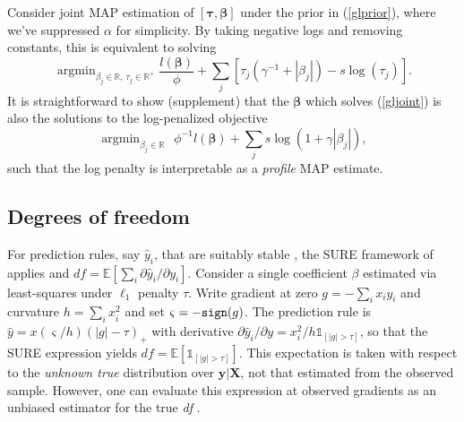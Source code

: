 \documentclass[12pt]{article}
\newcommand{\bs}[1]{\boldsymbol{#1}}
\newcommand{\bm}[1]{\mathbf{#1}}
\newcommand{\ds}[1]{\mathds{#1}}
\DeclareMathOperator*{\argmin}{argmin}
\begin{document}
Consider joint MAP estimation of $[\bs{\tau},\bs{\beta}]$ under the prior in
   (\ref{glprior}), where we've suppressed $\alpha$ for simplicity. By taking
   negative logs and removing constants, this is equivalent to solving
\begin{equation}\label{gljoint}
\argmin_{\beta_j\in\ds{R},~\tau_j \in \ds{R}^{+}}\!\!
\frac{l(\bs{\beta})}{\phi} + \sum_j \left[\tau_j(\gamma^{-1}+|\beta_j|) - s\log(\tau_j)\right].
\end{equation}
It is straightforward to show (supplement) that the $\bs{\beta}$ which solves (\ref{gljoint})  is also the solutions 
to the log-penalized objective 
\begin{equation}\label{logobj}
\argmin_{\beta_j\in\ds{R}}~~
\phi^{-1}l(\bs{\beta}) + \sum_j  s\log(1+\gamma|\beta_j|),
\end{equation}
such that the log penalty is interpretable as a {\it profile} MAP estimate.

\subsection{Degrees of freedom}


For prediction rules, say $\hat y_i$, that are suitably stable \citep[i.e.,
Lipschitz; see][]{zou_degrees_2007}, the SURE framework of
\cite{stein_estimation_1981} applies and  $df =
\ds{E}\left[\sum_i \partial \hat y_i/\partial y_i\right]$.
Consider  a single coefficient $\beta$ estimated via least-squares under $\ell_1$
penalty $\tau$.   Write gradient at zero $g = -\sum_i x_iy_i$ and curvature $h
= \sum_i x_i^2$ and set $\varsigma = -{\tt sign}(g)$. The prediction rule is
$\hat y = x(\varsigma/h)(|g|-\tau)_+$ with  derivative $\partial\hat y_i/\partial y = x_i^2/h \ds{1}_{[|g|>\tau]}$, so that the SURE expression
yields $df = \ds{E}\left[ \ds{1}_{[|g|>\tau]} \right]$.   This expectation is
taken with respect to the {\it unknown true} distribution over $\bm{y} |
\bm{X}$, not that estimated from the observed sample.  However, 
 one can evaluate this expression at observed
gradients as an unbiased estimator for the true \textit{df} \citep[e.g.,][]{zou_degrees_2007}.
\end{document}
